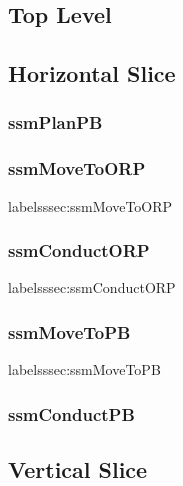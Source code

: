 \documentclass[../../main/main.tex]{subfiles}
\begin{document}
\subsection{Top Level}\label{ssec:toplevel}

\subsection{Horizontal Slice}\label{ssec:horizontalslice}

\subsubsection{ssmPlanPB}\label{sssec:ssmPlanPB}

\subsubsection{ssmMoveToORP}label{sssec:ssmMoveToORP}

\subsubsection{ssmConductORP}label{sssec:ssmConductORP}

\subsubsection{ssmMoveToPB}label{sssec:ssmMoveToPB}

\subsubsection{ssmConductPB}\label{sssec:ssmConductPB}

\subsection{Vertical Slice}\label{ssec:verticalslice}
\end{document}
